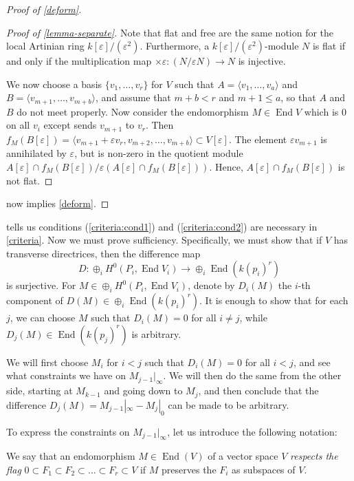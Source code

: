 \documentclass[11pt, two side, letterpaper, final]{amsart}
\newcommand {\from}{\colon}
\DeclareMathOperator{\End}{End}
\renewcommand{\epsilon}{\varepsilon}
\begin{document}
\begin{proof}[Proof of \cref{deform}]
\begin{proof}[Proof of \cref{lemma-separate}]
Note that flat and free are the same notion for the local Artinian ring $k[\epsilon]/(\epsilon^{2})$.  Furthermore, a $k[\epsilon]/(\epsilon^{2})$-module $N$ is flat if and only if the multiplication map 
$\times \epsilon \from \left(N/\epsilon N \right) \to N$ is injective. 

We now choose a basis $\{v_{1}, \ldots , v_{r}\}$ for $V$ such that $A = \langle v_{1}, \ldots ,v_{a}\rangle$ and $B = \langle v_{m+1}, \ldots , v_{m+b}\rangle$, and assume that $m+b < r$ and $m+1 \leq a$, so that $A$ and $B$ do not meet properly.  Now consider the endomorphism $M \in \End V$ which is $0$ on all $v_{i}$ except sends $v_{m+1}$ to $v_{r}$.   Then $f_{M}(B[\epsilon]) = \langle v_{m+1} + \epsilon v_{r}, v_{m+2}, \ldots ,v_{m+b}\rangle \subset V[\epsilon]$.  The element $\epsilon v_{m+1}$ is annihilated by $\epsilon$, but is non-zero in the quotient module $A[\epsilon] \cap f_{M}(B[\epsilon])/\epsilon(A[\epsilon] \cap f_{M}(B[\epsilon]))$. Hence, $A[\epsilon] \cap f_{M}(B[\epsilon])$ is not flat.
\end{proof}
 now implies \cref{deform}.
\end{proof}

 tells us conditions (\ref{criteria:cond1}) and (\ref{criteria:cond2}) are necessary in \cref{criteria}. Now we must prove sufficiency.
Specifically, we must show that if $V$ has transverse directrices, then the difference map
\[
D\from \oplus_{i}H^{0}(P_{i}, \End V_{i}) \to \oplus_{i} \End (k(p_{i})^{r})
\]
is surjective. For $M \in \oplus_{i}H^{0}(P_{i}, \End V_{i})$, denote by $D_i(M)$ the $i$-th component of $D(M) \in \oplus_{i} \End (k(p_{i})^{r})$.
It is enough to show that for each $j$, we can choose $M$ such that $D_i(M)=0$ for all 
$i \neq j$, while  $D_j(M) \in \End (k(p_j)^r)$ is arbitrary.

We will first choose $M_i$ for $i< j$ such that $D_i(M)=0$ for all $i<j$, and see what constraints we have on 
$M_{j-1}|_{\infty}$. We will then do the same from the other side, starting at $M_{k-1}$ and going down to $M_j$, and
then conclude that the difference $D_j(M)=M_{j-1}|_\infty- M_j|_0$ can be made to be arbitrary.

To express the constraints on $M_{j-1}|_{\infty}$, let us introduce the following notation:
\begin{definition}
We say that an endomorphism $M \in \End(V)$ of a vector space $V$ \emph{respects the flag} 
$0 \subset F_1 \subset F_2 \subset \ldots \subset F_r \subset V$ if $M$ preserves the $F_i$ as subspaces of $V$.
\end{definition}
\end{document}
